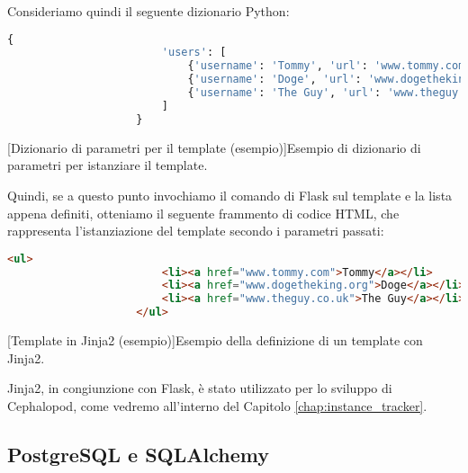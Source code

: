             Consideriamo quindi il seguente dizionario Python:
            
            \begin{center}
                \begin{lstlisting}[language=python, gobble=18]
                    {
                        'users': [
                            {'username': 'Tommy', 'url': 'www.tommy.com'},
                            {'username': 'Doge', 'url': 'www.dogetheking.org'},
                            {'username': 'The Guy', 'url': 'www.theguy.co.uk'}
                        ]
                    }
                \end{lstlisting}
                \captionsetup{textformat=empty,labelformat=empty} \vspace{-2em}
                [Dizionario di parametri per il template (esempio)]{Esempio di dizionario di parametri per istanziare il template.}
            \end{center}
            
            Quindi, se a questo punto invochiamo il comando  di Flask sul template e la lista appena definiti, otteniamo il seguente frammento di codice \ac{HTML}, che rappresenta l'istanziazione del template secondo i parametri passati:
            
            \begin{center}
                \begin{lstlisting}[language=html, gobble=18]
                    <ul>
                        <li><a href="www.tommy.com">Tommy</a></li>
                        <li><a href="www.dogetheking.org">Doge</a></li>
                        <li><a href="www.theguy.co.uk">The Guy</a></li>
                    </ul>
                \end{lstlisting}
                \captionsetup{textformat=empty,labelformat=empty} \vspace{-2em}
                [Template in Jinja2 (esempio)]{Esempio della definizione di un template con Jinja2.}
            \end{center}
            
            Jinja2, in congiunzione con Flask, è stato utilizzato per lo sviluppo di Cephalopod, come vedremo all'interno del Capitolo \ref{chap:instance_tracker}.
        
        \subsection{PostgreSQL e SQLAlchemy} \label{subsec:p;sl;postgreSQL_SQLAlchemy}
        
